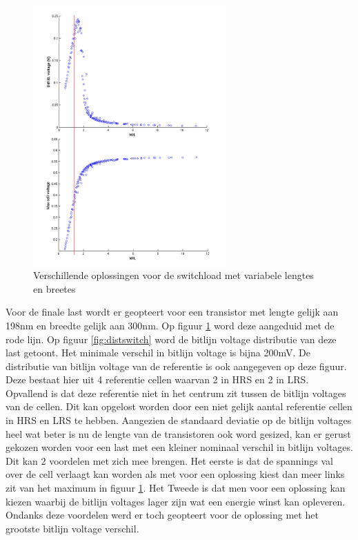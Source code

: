 \begin{figure}[!ht]
  \centering
  \includegraphics[width=0.66\textwidth]{../fig/hfdst-last-length.png}
  \caption{Verschillende oplossingen voor de switchload met variabele lengtes en breetes}
  \label{fig:length}
\end{figure}

Voor de finale last wordt er geopteert voor een transistor met lengte gelijk aan 198nm en breedte gelijk aan 300nm. Op figuur \ref{fig:length} word deze aangeduid met de rode lijn. Op figuur \ref{fig:distswitch} word de bitlijn voltage distributie van deze last getoont. Het minimale verschil in bitlijn voltage is bijna 200mV. De distributie van bitlijn voltage van de referentie is ook aangegeven op deze figuur. Deze bestaat hier uit 4 referentie cellen waarvan 2 in HRS en 2 in LRS. Opvallend is dat deze referentie niet in het centrum zit tussen de bitlijn voltages van de cellen. Dit kan opgelost worden door een niet gelijk aantal referentie cellen in HRS en LRS te hebben. Aangezien de standaard deviatie op de bitlijn voltages heel wat beter is nu de lengte van de transistoren ook word gesized, kan er gerust gekozen worden voor een last met een kleiner nominaal verschil in bitlijn voltages. Dit kan 2 voordelen met zich mee brengen. Het eerste is dat de spannings val over de cell verlaagt kan worden als met voor een oplossing kiest dan meer links zit van het maximum in figuur \ref{fig:length}. Het Tweede is dat men voor een oplossing kan kiezen waarbij de bitlijn voltages lager zijn wat een energie winst kan opleveren. Ondanks deze voordelen werd er toch geopteert voor de oplossing met het grootste bitlijn voltage verschil.

